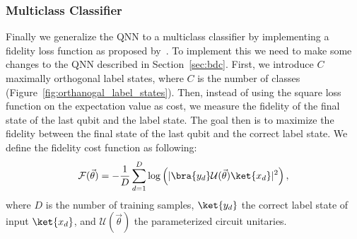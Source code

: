 \documentclass[a4paper,10pt]{article}
\begin{document}
\subsubsection{Multiclass Classifier} \label{sec:multiclass_classifier}
Finally we generalize the QNN to a multiclass classifier by implementing a fidelity loss function as proposed by~\cite{perez2019data}.
To implement this we need to make some changes to the QNN described in Section~\ref{sec:bdc}.
First, we introduce $C$ maximally orthogonal label states, where $C$ is the number of classes (Figure~\ref{fig:orthanogal_label_states}).
Then, instead of using the square loss function on the expectation value as cost, we measure the fidelity of the final state of the last qubit and the label state.
The goal then is to maximize the fidelity between the final state of the last qubit and the correct label state.
We define the fidelity cost function as following:
\begin{equation}
\mathcal{F}(\vec{\theta}) = - \dfrac{1}{D} \sum_{d=1}^{D} \log \left( \lvert \bra{y_d}\mathcal{U}(\vec{\theta})\ket{x_d} \rvert^2\right),
\end{equation}
where $D$ is the number of training samples, $\ket{y_d}$ the correct label state of input $\ket{x_d}$, and $\mathcal{U}(\vec{\theta})$ the parameterized circuit unitaries.
\end{document}
